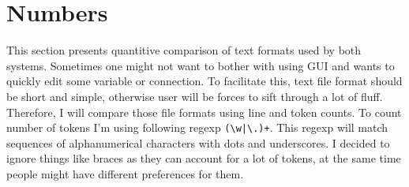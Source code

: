 \documentclass[12pt]{report}
\begin{document}
\section{Numbers}
This section presents quantitive comparison of text formats used by both systems. Sometimes one might not want to bother with using GUI and wants to quickly edit some variable or connection. To facilitate this, text file format should be short and simple, otherwise user will be forces to sift through a lot of fluff. Therefore, I will compare those file formats using line and token counts.
To count number of tokens I'm using following regexp \verb!(\w|\.)+!. This regexp will match sequences of alphanumerical characters with dots and underscores. I decided to ignore things like braces as they can account for a lot of tokens, at the same time people might have different preferences for them.
\end{document}
